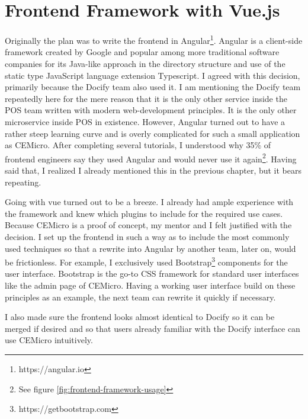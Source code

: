 \section{Frontend Framework with Vue.js}

Originally the plan was to write the frontend in Angular\footnote{https://angular.io}. Angular is a client-side framework created by Google and popular among more traditional software companies for its Java-like approach in the directory structure and use of the static type JavaScript language extension Typescript. I agreed with this decision, primarily because the Docify team also used it. I am mentioning the Docify team repeatedly here for the mere reason that it is the only other service inside the POS team written with modern web-development principles. It is the only other microservice inside POS in existence. However, Angular turned out to have a rather steep learning curve and is overly complicated for such a small application as CEMicro. After completing several tutorials, I understood why 35\% of frontend engineers say they used Angular and would never use it again\footnote{See figure \ref{fig:frontend-framework-usage}}. Having said that, I realized I already mentioned this in the previous chapter, but it bears repeating.

Going with vue turned out to be a breeze. I already had ample experience with the framework and knew which plugins to include for the required use cases. Because CEMicro is a proof of concept, my mentor and I felt justified with the decision. I set up the frontend in such a way as to include the most commonly used techniques so that a rewrite into Angular by another team, later on, would be frictionless. For example, I exclusively used Bootstrap\footnote{https://getbootstrap.com} components for the user interface. Bootstrap is the go-to CSS framework for standard user interfaces like the admin page of CEMicro. Having a working user interface build on these principles as an example, the next team can rewrite it quickly if necessary.

I also made sure the frontend looks almost identical to Docify so it can be merged if desired and so that users already familiar with the Docify interface can use CEMicro intuitively.

